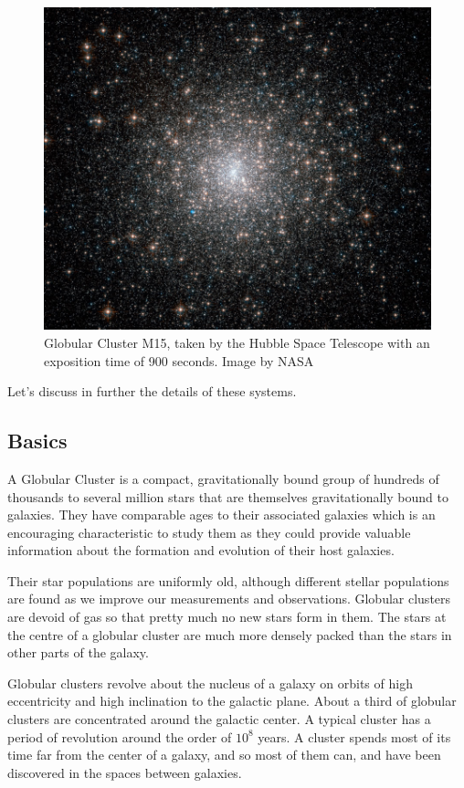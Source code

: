 \begin{figure}[H]
\centering
\includegraphics[width=12cm]{images/m15.jpg}
\caption[M15 Globular Cluster]{Globular Cluster M15, taken by the Hubble Space Telescope with an exposition time of 900 seconds. Image by NASA}
\end{figure}

Let's discuss in further the details of these systems.

\subsection{Basics}

A Globular Cluster is a compact, gravitationally bound group of hundreds of thousands to several million stars that are themselves gravitationally bound to galaxies. They have comparable ages to their associated galaxies which is an encouraging characteristic to study them as they could provide valuable information about the formation and evolution of their host galaxies.

Their star populations are uniformly old, although different stellar populations are found as we improve our measurements and observations. Globular clusters are devoid of gas so that pretty much no new stars form in them. The stars at the centre of a globular cluster are much more densely packed than the stars in other parts of the galaxy.

Globular clusters revolve about the nucleus of a galaxy on orbits of high eccentricity and high inclination to the galactic plane. About a third of globular clusters are concentrated around the galactic center. A typical cluster has a period of revolution around the order of $ 10^{8} $ years. A cluster spends most of its time far from the center of a galaxy, and so most of them can, and have been discovered in the spaces between galaxies. 

